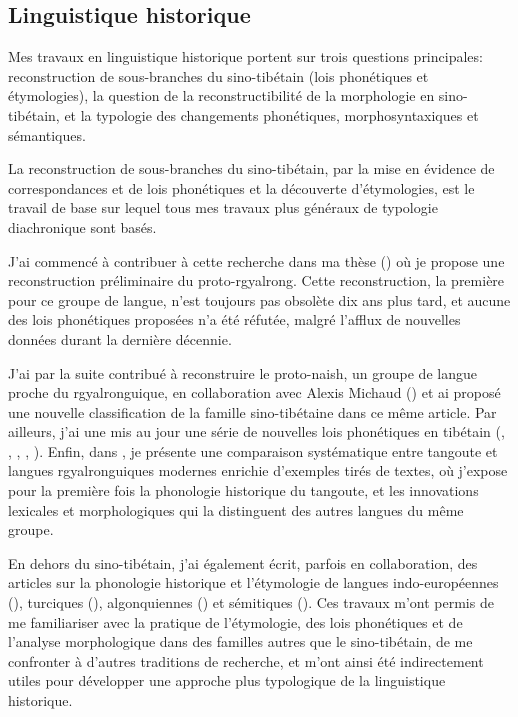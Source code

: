 \documentclass[oldfontcommands,oneside,a4paper,11pt]{article}
\begin{document}
\subsection{Linguistique historique}  \label{sec:diachronie}
Mes travaux en linguistique historique portent sur trois questions principales: reconstruction de sous-branches du sino-tibétain (lois phonétiques et étymologies), la question de la reconstructibilité de la morphologie en sino-tibétain, et la typologie des changements phonétiques, morphosyntaxiques et sémantiques.
 
La reconstruction de sous-branches du sino-tibétain, par la mise en évidence de correspondances et de lois phonétiques et la découverte d'étymologies, est le travail de base sur lequel tous mes travaux plus généraux de typologie diachronique sont basés. 

J'ai commencé à contribuer à cette recherche dans ma thèse (\citealt{jacques04these}) où je propose une reconstruction préliminaire du proto-rgyalrong. Cette reconstruction, la première pour ce groupe de langue,   n'est toujours pas obsolète dix ans plus tard, et aucune des lois phonétiques proposées n'a été réfutée, malgré l'afflux de nouvelles données durant la dernière décennie. 

J'ai par la suite contribué à reconstruire le proto-naish, un groupe de langue proche du rgyalronguique, en collaboration avec Alexis Michaud (\citealt{jacques.michaud11naish}) et ai proposé une nouvelle classification de la famille sino-tibétaine dans ce même article. Par ailleurs, j'ai  une mis au jour une série de nouvelles lois phonétiques en tibétain (\citealt{jacques09wazur},   \citealt{jacques09e},  \citealt{jacques12internal},   \citealt{jacques13yod}, \citealt{jacques14snom}). Enfin, dans  \citet{jacques14esquisse}, je présente une comparaison systématique entre tangoute et langues rgyalronguiques modernes enrichie d'exemples tirés de textes, où j'expose pour la première fois la phonologie historique du tangoute, et les innovations lexicales et morphologiques qui la distinguent des autres langues du même groupe.

En dehors du sino-tibétain, j'ai également écrit, parfois en collaboration, des articles sur la phonologie historique et l'étymologie de langues indo-européennes (\citealt{jacques13vama}),   turciques (\citealt{antonov12kumush}), algonquiennes (\citealt{jacques13arapaho}) et sémitiques (\citealt{rg-gj12yod}). Ces travaux m'ont permis de me familiariser avec la pratique de l'étymologie, des lois phonétiques et de l'analyse morphologique dans des familles autres que le sino-tibétain, de me confronter à d'autres traditions de recherche, et m'ont ainsi été indirectement utiles pour développer une approche plus typologique de la linguistique historique.
\end{document}
